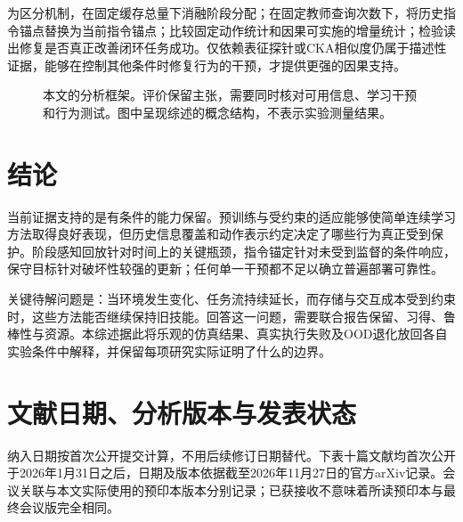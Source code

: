 \documentclass[UTF8,11pt,a4paper,fontset=fandol]{ctexart}
\begin{document}
为区分机制，在固定缓存总量下消融阶段分配；在固定教师查询次数下，将历史指令锚点替换为当前指令锚点；比较固定动作统计和因果可实施的增量统计；检验读出修复是否真正改善闭环任务成功。仅依赖表征探针或CKA相似度仍属于描述性证据，能够在控制其他条件时修复行为的干预，才提供更强的因果支持。

\begin{figure}[htbp]
\centering
{}
\caption{本文的分析框架。评价保留主张，需要同时核对可用信息、学习干预和行为测试。图中呈现综述的概念结构，不表示实验测量结果。}
\end{figure}

\section{结论}
当前证据支持的是有条件的能力保留。预训练与受约束的适应能够使简单连续学习方法取得良好表现，但历史信息覆盖和动作表示约定决定了哪些行为真正受到保护。阶段感知回放针对时间上的关键瓶颈，指令锚定针对未受到监督的条件响应，保守目标针对破坏性较强的更新；任何单一干预都不足以确立普遍部署可靠性。

关键待解问题是：当环境发生变化、任务流持续延长，而存储与交互成本受到约束时，这些方法能否继续保持旧技能。回答这一问题，需要联合报告保留、习得、鲁棒性与资源。本综述据此将乐观的仿真结果、真实执行失败及OOD退化放回各自实验条件中解释，并保留每项研究实际证明了什么的边界。

\appendix
\section{文献日期、分析版本与发表状态}
纳入日期按首次公开提交计算，不用后续修订日期替代。下表十篇文献均首次公开于2026年1月31日之后，日期及版本依据截至2026年11月27日的官方arXiv记录。会议关联与本文实际使用的预印本版本分别记录；已获接收不意味着所读预印本与最终会议版完全相同。
\end{document}
